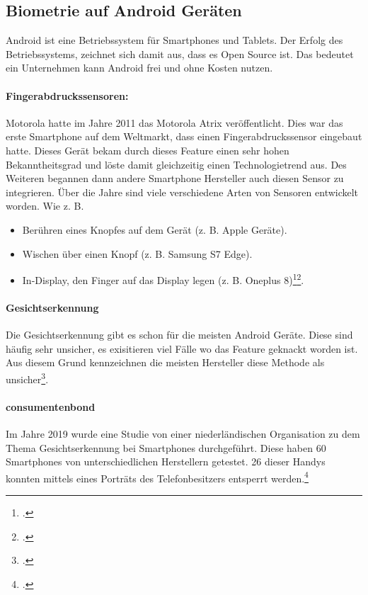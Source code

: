 \subsection{Biometrie auf Android Geräten}
Android ist eine Betriebssystem für Smartphones und Tablets. Der Erfolg des Betriebssystems, zeichnet sich damit aus, dass es Open Source ist. Das bedeutet ein Unternehmen kann Android frei und ohne Kosten nutzen.
\paragraph{Fingerabdruckssensoren:}
Motorola hatte im Jahre 2011 das Motorola Atrix veröffentlicht. Dies war das erste Smartphone auf dem Weltmarkt, dass einen Fingerabdruckssensor eingebaut hatte.
Dieses Gerät bekam durch dieses Feature einen sehr hohen Bekanntheitsgrad und löste damit gleichzeitig einen Technologietrend aus.
Des Weiteren begannen dann andere Smartphone Hersteller auch diesen Sensor zu integrieren.
Über die Jahre sind viele verschiedene Arten von Sensoren entwickelt worden. Wie z. B.
\begin{itemize}
	\item Berühren eines Knopfes auf dem Gerät (z. B. Apple Geräte).
	\item Wischen über einen Knopf (z. B. Samsung S7 Edge).
	\item In-Display, den Finger auf das Display legen (z. B. Oneplus 8)\footcite{fingerabdruck-android-1}\footcite{fingerabdruck-android-2}. 
\end{itemize}
\paragraph{Gesichtserkennung}
Die Gesichtserkennung gibt es schon für die meisten Android Geräte. Diese sind häufig sehr unsicher, es exisitieren viel Fälle wo das Feature geknackt worden ist. Aus diesem Grund kennzeichnen die meisten Hersteller diese Methode als unsicher\footcite{gesichtserkennung-android}. 

\paragraph{consumentenbond}
Im Jahre 2019 wurde eine Studie von einer niederländischen Organisation zu dem Thema Gesichtserkennung bei Smartphones durchgeführt. 
Diese haben 60 Smartphones von unterschiedlichen Herstellern getestet. 26 dieser Handys konnten mittels eines Porträts des Telefonbesitzers entsperrt werden.\footcite{consumentenbond}


